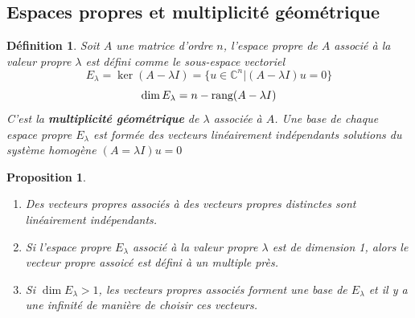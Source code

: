 \documentclass{article}[french, babel]
\newtheorem{mydef}{Définition}
\newtheorem{myprop}{Proposition}
\begin{document}
	\subsection{Espaces propres et multiplicité géométrique}
		\begin{mydef}
			Soit $A$ une matrice d'ordre $n$, l'espace propre de $A$ associé à la valeur propre $\lambda$ est défini comme le sous-espace vectoriel 
			\[E_{\lambda}=\ker(A-\lambda I)=\{u\in\mathbb{C}^n \lvert (A-\lambda I)u=0\}\]
			\[\dim E_{\lambda}=n-\text{\normalfont{rang}}(A-\lambda I)\]
			C'est la \textbf{multiplicité géométrique} de $\lambda$ associée à $A$. Une base de chaque espace propre $E_{\lambda}$ est formée des vecteurs linéairement indépendants solutions du système homogène $(A=\lambda I)u=0$
		\end{mydef}
		\begin{myprop}
			~
			\begin{enumerate}
				\item Des vecteurs propres associés à des vecteurs propres distinctes sont linéairement indépendants.
				\item Si l'espace propre $E_{\lambda}$ associé à la valeur propre $\lambda$ est de dimension 1, alors le vecteur propre assoicé est défini à un multiple près.
				\item Si $\dim E_{\lambda}>1$, les vecteurs propres associés forment une base de $E_{\lambda}$ et il y a une infinité de manière de choisir ces vecteurs.
			\end{enumerate}
		\end{myprop}
\end{document}
